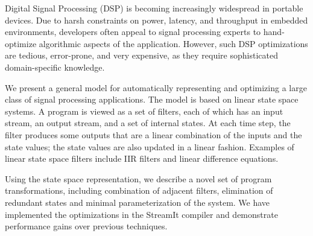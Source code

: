 Digital Signal Processing (DSP) is becoming increasingly widespread in
portable devices. Due to harsh constraints on power, latency, and
throughput in embedded environments, developers often appeal to signal
processing experts to hand-optimize algorithmic aspects of the
application.  However, such DSP optimizations are tedious,
error-prone, and very expensive, as they require sophisticated
domain-specific knowledge.

We present a general model for automatically representing and
optimizing a large class of signal processing applications. The model
is based on linear state space systems. A program is viewed as a set
of filters, each of which has an input stream, an output stream, and a
set of internal states. At each time step, the filter produces some
outputs that are a linear combination of the inputs and the state
values; the state values are also updated in a linear
fashion. Examples of linear state space filters include IIR filters
and linear difference equations.

Using the state space representation, we describe a novel set of
program transformations, including combination of adjacent filters,
elimination of redundant states and minimal parameterization of the
system. We have implemented the optimizations in the StreamIt compiler
and demonstrate performance gains over previous techniques.
